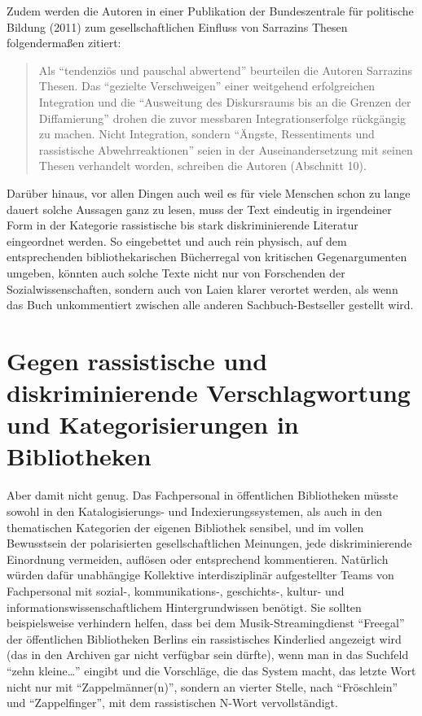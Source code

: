 \documentclass[a4paper,
fontsize=11pt,
oneside,
numbers=noperiodatend,
parskip=half-,
bibliography=totoc,
final
]{scrartcl}
\begin{document}
Zudem werden die Autoren in einer Publikation der Bundeszentrale für
politische Bildung (2011) zum gesellschaftlichen Einfluss von Sarrazins
Thesen folgendermaßen zitiert:

\begin{quote}
Als \enquote{tendenziös und pauschal abwertend} beurteilen die Autoren
Sarrazins Thesen. Das \enquote{gezielte Verschweigen} einer weitgehend
erfolgreichen Integration und die \enquote{Ausweitung des Diskursraums
bis an die Grenzen der Diffamierung} drohen die zuvor messbaren
Integrationserfolge rückgängig zu machen. Nicht Integration, sondern
\enquote{Ängste, Ressentiments und rassistische Abwehrreaktionen} seien
in der Auseinandersetzung mit seinen Thesen verhandelt worden, schreiben
die Autoren (Abschnitt 10).
\end{quote}

Darüber hinaus, vor allen Dingen auch weil es für viele Menschen schon
zu lange dauert solche Aussagen ganz zu lesen, muss der Text eindeutig
in irgendeiner Form in der Kategorie rassistische bis stark
diskriminierende Literatur eingeordnet werden. So eingebettet und auch
rein physisch, auf dem entsprechenden bibliothekarischen Bücherregal von
kritischen Gegenargumenten umgeben, könnten auch solche Texte nicht nur
von Forschenden der Sozialwissenschaften, sondern auch von Laien klarer
verortet werden, als wenn das Buch unkommentiert zwischen alle anderen
Sachbuch-Bestseller gestellt wird.

\hypertarget{gegen-rassistische-und-diskriminierende-verschlagwortung-und-kategorisierungen-in-bibliotheken}{%
\section*{Gegen rassistische und diskriminierende Verschlagwortung
und Kategorisierungen in
Bibliotheken}\label{gegen-rassistische-und-diskriminierende-verschlagwortung-und-kategorisierungen-in-bibliotheken}}

Aber damit nicht genug. Das Fachpersonal in öffentlichen Bibliotheken
müsste sowohl in den Katalogisierungs- und Indexierungssystemen, als
auch in den thematischen Kategorien der eigenen Bibliothek sensibel, und
im vollen Bewusstsein der polarisierten gesellschaftlichen Meinungen,
jede diskriminierende Einordnung vermeiden, auflösen oder entsprechend
kommentieren. Natürlich würden dafür unabhängige Kollektive
interdisziplinär aufgestellter Teams von Fachpersonal mit sozial-,
kommunikations-, geschichts-, kultur- und informationswissenschaftlichem
Hintergrundwissen benötigt. Sie sollten beispielsweise verhindern
helfen, dass bei dem Musik-Streamingdienst \enquote{Freegal} der
öffentlichen Bibliotheken Berlins ein rassistisches Kinderlied angezeigt
wird (das in den Archiven gar nicht verfügbar sein dürfte), wenn man in
das Suchfeld \enquote{zehn kleine\ldots{}} eingibt und die Vorschläge,
die das System macht, das letzte Wort nicht nur mit
\enquote{Zappelmänner(n)}, sondern an vierter Stelle, nach
\enquote{Fröschlein} und \enquote{Zappelfinger}, mit dem rassistischen
N-Wort vervollständigt.
\end{document}
